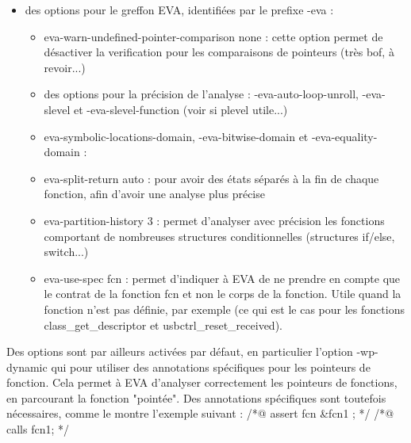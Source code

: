 \begin{itemize}
\begin{itemize}
		\end{itemize}
	\item des options pour le greffon EVA, identifiées par le prefixe -eva :
		\begin{itemize}
			\item eva-warn-undefined-pointer-comparison none : cette option permet de désactiver la verification pour les comparaisons de pointeurs (très bof, à revoir...)
			\item des options pour la précision de l'analyse : -eva-auto-loop-unroll, -eva-slevel et -eva-slevel-function (voir si plevel utile...)
			\item eva-symbolic-locations-domain, -eva-bitwise-domain et -eva-equality-domain :
			\item eva-split-return auto : pour avoir des états séparés à la fin de chaque fonction, afin d'avoir une analyse plus précise
			\item eva-partition-history 3 : permet d'analyser avec précision les fonctions comportant de nombreuses structures conditionnelles (structures if/else, switch...)
			\item eva-use-spec fcn : permet d'indiquer à EVA de ne prendre en compte que le contrat de la fonction fcn et non le corps de la fonction. Utile quand la fonction n'est pas définie, par exemple (ce qui est le cas pour les fonctions class\_get\_descriptor et usbctrl\_reset\_received).
		\end{itemize}
\end{itemize}

\noindent Des options sont par ailleurs activées par défaut, en particulier l'option -wp-dynamic qui pour utiliser des annotations spécifiques pour les pointeurs de fonction. Cela permet à EVA d'analyser correctement les pointeurs de fonctions, en parcourant la fonction "pointée". Des annotations spécifiques sont toutefois nécessaires, comme le montre l'exemple suivant :
\newline \noindent /*@ assert fcn {\&fcn1} ; */
\newline \noindent /*@ calls fcn1; */



